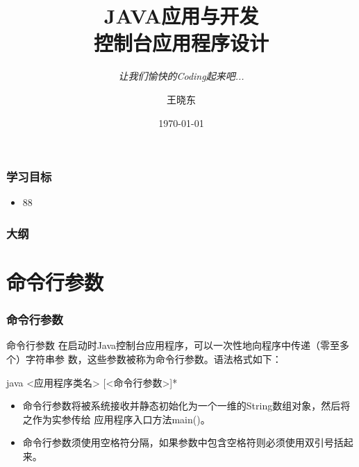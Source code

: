 
\title{\hei JAVA应用与开发\\  控制台应用程序设计}
\subtitle{\it 让我们愉快的Coding起来吧...}
\author{王晓东}
\date{\today}


\begin{frame}
  \maketitle
\end{frame}

\begin{frame}
  \frametitle{学习目标}
  \begin{itemize}
  \item 88
  \end{itemize}
\end{frame}

\begin{frame}
  \frametitle{大纲}
  \tableofcontents
\end{frame}

\section{命令行参数}

\begin{frame}[fragile] %
\frametitle{命令行参数}

\begin{block}{命令行参数}
  在启动时Java控制台应用程序，可以一次性地向程序中传递（零至多个）字符串参
  数，这些参数被称为命令行参数。语法格式如下：

  \begin{shCode}
    java <应用程序类名> [<命令行参数>]*
  \end{shCode}
\end{block}

\pause


\begin{itemize}\kai
\item 命令行参数将被系统接收并静态初始化为一个一维的String数组对象，然后将之作为实参传给
  应用程序入口方法main()。
\item 命令行参数须使用空格符分隔，如果参数中包含空格符则必须使用双引号括起来。
\end{itemize}
\end{frame}

